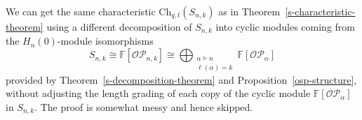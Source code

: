 \documentclass[ALCO,ThmDefs,published]{cedram}
\newcommand{\symm}{{\mathfrak{S}}}
\newcommand{\FF}{{\mathbb{F}}}
\theoremstyle{plain}
\newcommand{\inv}{{\mathrm {inv}}}
\newcommand{\Des}{{\mathrm {Des}}}
\newcommand{\Ch}{{\mathrm {Ch}}}
\newcommand{\symm}{{\mathfrak{S}}}
\newcommand{\OP}{{\mathcal{OP}}}
\newcommand{\FF}{{\mathbb{F}}}
\newcommand{\ii}{{\mathbf{i}}}
\newcommand{\edit}[1]{{\color{red}{\bf {#1}}}}
\begin{document}
\begin{remark}
We can get the same characteristic 
$\Ch_{q,t}(S_{n,k})$ as in Theorem~\ref{s-characteristic-theorem} using a different decomposition of 
$S_{n,k}$ into cyclic modules coming from the $H_n(0)$-module isomorphisms
\[ S_{n,k} \cong \FF[\OP_{n,k}] \cong\bigoplus_{ \substack{\alpha\models n \\ \ell(\alpha)=k }} \FF[\OP_\alpha] \]
provided by Theorem~\ref{s-decomposition-theorem} and Proposition~\ref{osp-structure}, without adjusting the length grading of each copy of the cyclic module $\FF[\OP_\alpha]$ in $S_{n,k}$.
The proof is somewhat messy and hence skipped.
%
%
%

\end{remark}
\end{document}

